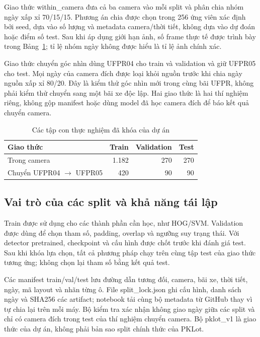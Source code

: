 Giao thức within\_camera đưa cả ba camera vào mỗi split và phân chia nhóm ngày xấp xỉ 70/15/15. Phương án chia được chọn trong 256 ứng viên xác định bởi seed, dựa vào số lượng và metadata camera/thời tiết, không dựa vào dự đoán hoặc điểm số test. Sau khi áp dụng giới hạn ảnh, số frame thực tế được trình bày trong Bảng~\ref{tab:splits}; tỉ lệ nhóm ngày không được hiểu là tỉ lệ ảnh chính xác.

Giao thức chuyển góc nhìn dùng UFPR04 cho train và validation và giữ UFPR05 cho test. Mọi ngày của camera đích được loại khỏi nguồn trước khi chia ngày nguồn xấp xỉ 80/20. Đây là kiểm thử góc nhìn mới trong cùng bãi UFPR, không phải kiểm thử chuyển sang một bãi xe độc lập. Hai giao thức là hai thí nghiệm riêng, không gộp manifest hoặc dùng model đã học camera đích để báo kết quả chuyển camera.

\begin{table}[htbp]
\centering
\caption{Các tập con thực nghiệm đã khóa của dự án}
\label{tab:splits}
\begin{tabular}{lrrr}
\toprule
Giao thức & Train & Validation & Test \\
\midrule
Trong camera & 1.182 & 270 & 270 \\
Chuyển UFPR04 \(\rightarrow\) UFPR05 & 420 & 90 & 90 \\
\bottomrule
\end{tabular}
\end{table}

\subsection{Vai trò của các split và khả năng tái lập}
Train được sử dụng cho các thành phần cần học, như HOG/SVM. Validation được dùng để chọn tham số, padding, overlap và ngưỡng suy trạng thái. Với detector pretrained, checkpoint và cấu hình được chốt trước khi đánh giá test. Sau khi khóa lựa chọn, tất cả phương pháp chạy trên cùng tập test của giao thức tương ứng; không chọn lại tham số bằng kết quả test.

Các manifest train/val/test lưu đường dẫn tương đối, camera, bãi xe, thời tiết, ngày, mã layout và nhãn từng ô. File split\_lock.json ghi cấu hình, danh sách ngày và SHA256 các artifact; notebook tải cùng bộ metadata từ GitHub thay vì tự chia lại trên mỗi máy. Bộ kiểm tra xác nhận không giao ngày giữa các split và chỉ có camera đích trong test của thí nghiệm chuyển camera. Bộ pklot\_v1 là giao thức của dự án, không phải bản sao split chính thức của PKLot.
